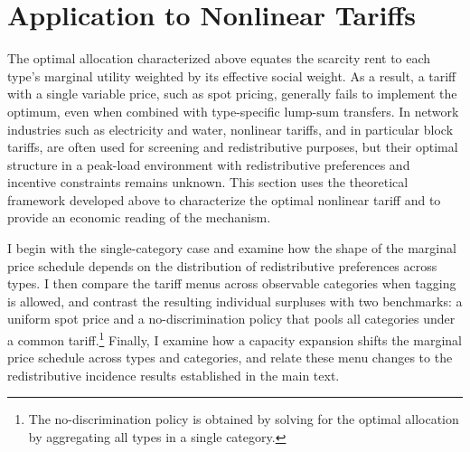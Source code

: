 \documentclass{class}
\begin{document}
\section{Application to Nonlinear Tariffs}

The optimal allocation characterized above equates the scarcity rent to each type's marginal utility weighted by its effective social weight. As a result, a tariff with a single variable price, such as spot pricing, generally fails to implement the optimum, even when combined with type-specific lump-sum transfers. In network industries such as electricity and water, nonlinear tariffs, and in particular block tariffs, are often used for screening and redistributive purposes, but their optimal structure in a peak-load environment with redistributive preferences and incentive constraints remains unknown. This section uses the theoretical framework developed above to characterize the optimal nonlinear tariff and to provide an economic reading of the mechanism.

I begin with the single-category case and examine how the shape of the marginal price schedule depends on the distribution of redistributive preferences across types. I then compare the tariff menus across observable categories when tagging is allowed, and contrast the resulting individual surpluses with two benchmarks: a uniform spot price and a no-discrimination policy that pools all categories under a common tariff.\footnote{The no-discrimination policy is obtained by solving for the optimal allocation by aggregating all types in a single category.} Finally, I examine how a capacity expansion shifts the marginal price schedule across types and categories, and relate these menu changes to the redistributive incidence results established in the main text.
\end{document}
